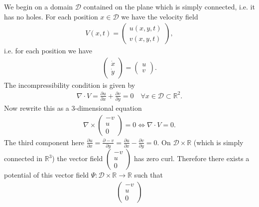 \begin{ex}
	We begin on a domain $\mathcal{D}$ contained on the plane which is simply connected, i.e. it has no holes. For each position $x\in \mathcal{D}$ we have the velocity field
	\begin{align}
		{V}(x,t) = 
		\begin{pmatrix}
			u(x,y,t) \\ v(x,y,t)
		\end{pmatrix},
	\end{align}
	i.e. for each position we have
	 \begin{align}
		\begin{pmatrix}
			\dot{x} \\ \dot{y}
		\end{pmatrix}
		= 
		\begin{pmatrix}
			u \\v
		\end{pmatrix}
		.
	\end{align}
The incompressibility condition is given by 
\begin{align}
	\nabla \cdot V = \frac{\partial u}{\partial x} + \frac{\partial v}{\partial y}= 0\quad \forall x\in \mathcal{D}\subset \mathbb{R}^{2}.
\end{align}
Now rewrite this as a 3-dimensional equation
\begin{align}
	\nabla \times 
	\begin{pmatrix}
		-v \\ u \\ 0 
	\end{pmatrix}
	=0 \Leftrightarrow
	\nabla \cdot V = 0.
\end{align}
The third component here $\frac{\partial u}{\partial x} =  \frac{\partial -v}{\partial y}= \frac{\partial u}{\partial x} - \frac{\partial v}{\partial y}=0$. On $\mathcal{D}\times \mathbb{R}$ (which is simply connected in $\mathbb{R}^{3}$) the vector field $
\begin{pmatrix}
	-v \\ u \\ 0
\end{pmatrix}
$ has zero curl. Therefore there exists a potential of this vector field $\Psi:\mathcal{D}\times \mathbb{R} \to \mathbb{R}$ such that
\begin{align}
\begin{pmatrix}
	-v \\ u \\ 0 
\end{pmatrix}

\end{align}
\end{ex}
